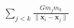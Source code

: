 \documentclass[preview]{standalone}
\begin{document}
\begin{align*}
\sum_{j<k}\frac{Gm_jm_k}{\|\mathbf x_i-\mathbf x_j\|}
\end{align*}
\end{document}
